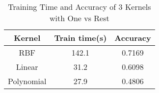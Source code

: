 \documentclass[final,authoryear,3p,times,onecolumn]{elsarticle}
\theoremstyle{definition}
\begin{document}
\begin{table}[h]
	\begin{center}
		\caption{Training Time and Accuracy of 3 Kernels with One vs Rest}
		\begin{tabular}{|c|c|c|}
			\hline  Kernel & Train time(s) & Accuracy \\
			\hline RBF & 142.1 & 0.7169 \\
			\hline Linear & 31.2 & 0.6098 \\
			\hline Polynomial & 27.9 & 0.4806 \\
			\hline
		\end{tabular}
	\end{center}
\end{table}
\end{document}
